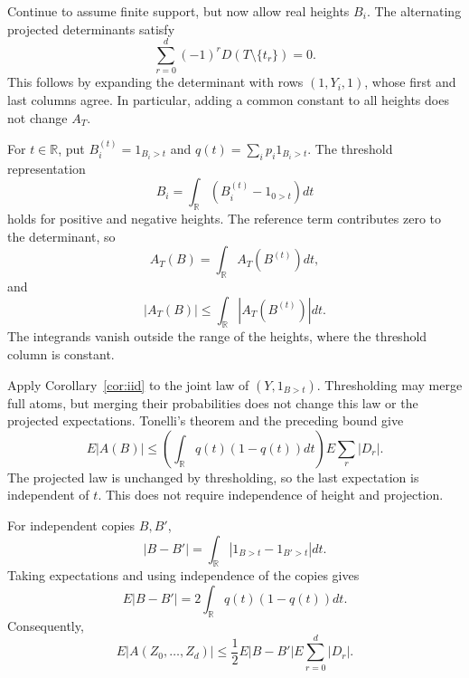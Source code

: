 \documentclass[11pt]{article}
\theoremstyle{remark}
\newcommand{\R}{\mathbb{R}}
\newcommand{\E}{E}
\newcommand{\one}{1}
\begin{document}
\begin{aiblock}


Continue to assume finite support, but now allow real heights $B_i$.
The alternating projected determinants satisfy
\begin{equation}
\sum_{r=0}^d(-1)^rD(T\setminus\{t_r\})=0.
\end{equation}
This follows by expanding the determinant with rows $(1,Y_i,1)$, whose
first and last columns agree. In particular, adding a common constant
to all heights does not change $A_T$.

For $t\in\R$, put $B_i^{(t)}=\one_{B_i>t}$ and
$q(t)=\sum_i p_i\one_{B_i>t}$. The threshold representation
$$B_i=\int_\R(B_i^{(t)}-\one_{0>t})dt$$
holds for positive and negative heights. The reference term contributes
zero to the determinant, so
\begin{equation}
A_T(B)=\int_\R A_T(B^{(t)})dt,
\end{equation}
and
\begin{equation}
|A_T(B)|\leq\int_\R|A_T(B^{(t)})|dt.
\end{equation}
The integrands vanish outside the range of the heights, where the
threshold column is constant.

Apply Corollary~\ref{cor:iid} to the joint law of $(Y,\one_{B>t})$.
Thresholding may merge full atoms, but merging their probabilities does
not change this law or the projected expectations. Tonelli's theorem
and the preceding bound give
\begin{equation}
\E|A(B)|\leq\left(\int_\R q(t)(1-q(t))dt\right)\E\sum_r|D_r|.
\end{equation}
The projected law is unchanged by thresholding, so the last expectation
is independent of $t$. This does not require independence of height and
projection.

For independent copies $B,B'$,
\begin{equation}
|B-B'|=\int_\R|\one_{B>t}-\one_{B'>t}|dt.
\end{equation}
Taking expectations and using independence of the copies gives
\begin{equation}
\E|B-B'|=2\int_\R q(t)(1-q(t))dt.
\end{equation}
Consequently,
\begin{equation}
\E|A(Z_0,\ldots,Z_d)|\leq\frac12\E|B-B'|\E\sum_{r=0}^d|D_r|.
\label{eq:det-onestep}
\end{equation}


\end{aiblock}
\end{document}

